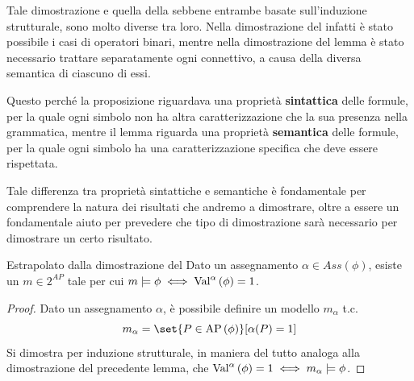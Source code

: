 \begin{note}{}
  Tale dimostrazione e quella della  sebbene entrambe basate sull'induzione strutturale, sono molto diverse tra loro. Nella dimostrazione del  infatti è stato possibile  i casi di operatori binari, mentre nella dimostrazione del lemma è stato necessario trattare separatamente ogni connettivo, a causa della diversa semantica di ciascuno di essi.

  Questo perché la proposizione riguardava una proprietà \textbf{sintattica} delle formule, per la quale ogni simbolo non ha altra caratterizzazione che la sua presenza nella grammatica, mentre il lemma riguarda una proprietà \textbf{semantica} delle formule, per la quale ogni simbolo ha una caratterizzazione specifica che deve essere rispettata.

  Tale differenza tra proprietà sintattiche e semantiche è fondamentale per comprendere la natura dei risultati che andremo a dimostrare, oltre a essere un fondamentale aiuto per prevedere che tipo di dimostrazione sarà necessario per dimostrare un certo risultato.
\end{note}

\begin{lemma}[listtitle={Estrapolato dalla dimostrazione del \Cref{thm:validity-equals-taut}}]{\infosymbol{} Estrapolato dalla dimostrazione del }
  Dato un assegnamento \(\alpha \in Ass(\phi)\), esiste un \(m \in 2^{AP}\) tale per cui \(m \models \phi \iff \Val{\alpha}[\phi]=1\).
\end{lemma}

\begin{proof}
  Dato un assegnamento \(\alpha\), è possibile definire un modello \(m_{\alpha}\) t.c.
  \[m_\alpha = \set{P \in \AP[\phi]}[\alpha(P) = 1]\]
  Si dimostra per induzione strutturale, in maniera del tutto analoga alla dimostrazione del precedente lemma, che \(\Val{\alpha}[\phi] = 1 \iff m_\alpha \models \phi\).
\end{proof}

